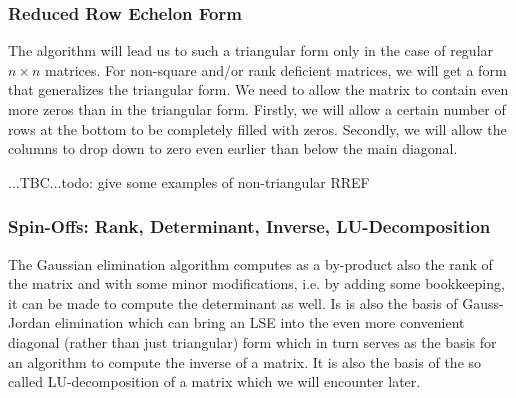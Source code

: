 \subsubsection{Reduced Row Echelon Form}
The algorithm will lead us to such a triangular form only in the case of regular $n \times n$ matrices. For non-square and/or rank deficient matrices, we will get a form that generalizes the triangular form. We need to allow the matrix to contain even more zeros than in the triangular form. Firstly, we will allow a certain number of rows at the bottom to be completely filled with zeros. Secondly, we will allow the columns to drop down to zero even earlier than below the main diagonal.

...TBC...todo: give some examples of non-triangular RREF




\subsubsection{Spin-Offs: Rank, Determinant, Inverse, LU-Decomposition}
The Gaussian elimination algorithm computes as a by-product also the rank of the matrix and with some minor modifications, i.e. by adding some bookkeeping, it can be made to compute the determinant as well. Is is also the basis of Gauss-Jordan elimination which can bring an LSE into the even more convenient diagonal (rather than just triangular) form which in turn serves as the basis for an algorithm to compute the inverse of a matrix. It is also the basis of the so called LU-decomposition of a matrix which we will encounter later.




